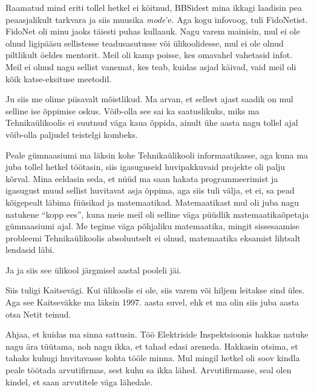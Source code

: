 
Raamatud mind eriti  tollel hetkel ei köitnud, BBSidest mina ikkagi laadisin pea peaasjalikult tarkvara ja siis muusika \emph{mode}'e. Aga kogu infovoog, tuli FidoNetist. FidoNet oli minu jaoks täiesti puhas kullaauk. Nagu varem mainisin,  mul ei ole olnud ligipääsu  sellistesse teadusasutusse või ülikoolidesse,  mul ei ole olnud piltlikult öeldes mentorit. Meil oli kamp poisse, kes omavahel vahetasid infot. Meil ei olnud nagu sellist vanemat, kes teab, kuidas asjad käivad, vaid meil oli kõik katse-eksituse meetodil.


Ju siis me olime piisavalt mõistlikud. Ma arvan, et sellest ajast saadik on mul selline ise õppimise  oskus. Võib-olla see sai ka saatuslikuks, miks ma Tehnikaülikoolis ei suutnud väga kaua õppida,  ainult ühe aasta nagu tollel ajal võib-olla paljudel teistelgi kombeks.

Peale gümnaasiumi ma läksin kohe Tehnikaülikooli informaatikasse, aga kuna ma juba tollel hetkel töötasin, siis igasuguseid huvipakkuvaid projekte oli  palju kõrval. Mina eeldasin seda, et nüüd ma saan hakata programmeerimist ja igasugust muud sellist huvitavat asja õppima, aga siis tuli välja, et ei,  sa pead kõigepealt läbima füüsikad ja matemaatikad. Matemaatikast mul oli juba nagu natukene \enquote{kopp ees}, kuna meie meil oli selline väga püüdlik matemaatikaõpetaja gümnaasiumi ajal. Me tegime väga põhjaliku matemaatika, mingit sissesaamise probleemi Tehnikaülikoolis  absoluutselt ei olnud,  matemaatika eksamist lihtsalt lendasid läbi.

Ja ja siis see ülikool järgmisel aastal pooleli jäi.


Siis tuligi Kaitsevägi. Kui ülikoolis ei ole, siis varem või hiljem leitakse sind üles. Aga see Kaitseväkke ma läksin 1997. aasta suvel, ehk et ma olin siis juba aasta otsa Netit teinud. 

Ahjaa, et kuidas ma sinna sattusin. Töö Elektriside Inspektsioonis  hakkas natuke nagu ära tüütama, noh nagu ikka, et tahad edasi areneda. Hakkasin otsima, et tahaks kuhugi  huvitavasse kohta tööle minna.  Mul mingil hetkel oli soov kindla peale töötada arvutifirmas, sest kuhu sa ikka lähed. Arvutifirmasse, seal olen kindel, et saan arvutitele väga lähedale.

